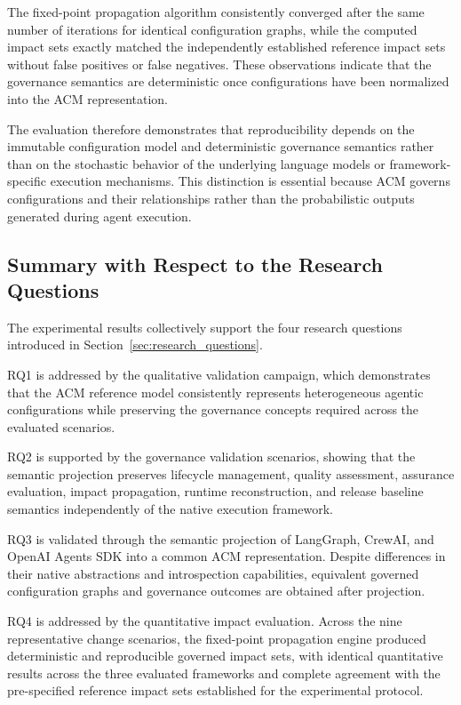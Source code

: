 \documentclass[10pt]{article}
\begin{document}
The fixed-point propagation algorithm consistently converged after the same number of iterations for identical configuration graphs, while the computed impact sets exactly matched the independently established reference impact sets without false positives or false negatives. These observations indicate that the governance semantics are deterministic once configurations have been normalized into the ACM representation.

The evaluation therefore demonstrates that reproducibility depends on the immutable configuration model and deterministic governance semantics rather than on the stochastic behavior of the underlying language models or framework-specific execution mechanisms. This distinction is essential because ACM governs configurations and their relationships rather than the probabilistic outputs generated during agent execution.

\subsection{Summary with Respect to the Research Questions}
\label{sec:rq_summary}

The experimental results collectively support the four research questions introduced in Section~\ref{sec:research_questions}.

RQ1 is addressed by the qualitative validation campaign, which demonstrates that the ACM reference model consistently represents heterogeneous agentic configurations while preserving the governance concepts required across the evaluated scenarios.

RQ2 is supported by the governance validation scenarios, showing that the semantic projection preserves lifecycle management, quality assessment, assurance evaluation, impact propagation, runtime reconstruction, and release baseline semantics independently of the native execution framework.

RQ3 is validated through the semantic projection of LangGraph, CrewAI, and OpenAI Agents SDK into a common ACM representation. Despite differences in their native abstractions and introspection capabilities, equivalent governed configuration graphs and governance outcomes are obtained after projection.

RQ4 is addressed by the quantitative impact evaluation. Across the nine representative change scenarios, the fixed-point propagation engine produced deterministic and reproducible governed impact sets, with identical quantitative results across the three evaluated frameworks and complete agreement with the pre-specified reference impact sets established for the experimental protocol.
\end{document}
